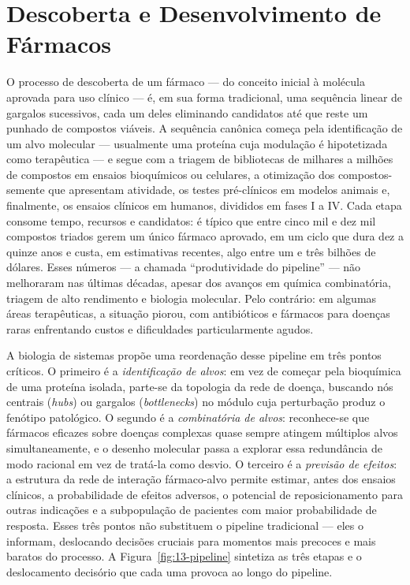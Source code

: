 \section{Descoberta e Desenvolvimento de Fármacos}
\label{sec:13-farmacos}

O processo de descoberta de um fármaco --- do conceito inicial à molécula aprovada para uso clínico --- é, em sua forma tradicional, uma sequência linear de gargalos sucessivos, cada um deles eliminando candidatos até que reste um punhado de compostos viáveis. A sequência canônica começa pela identificação de um alvo molecular --- usualmente uma proteína cuja modulação é hipotetizada como terapêutica --- e segue com a triagem de bibliotecas de milhares a milhões de compostos em ensaios bioquímicos ou celulares, a otimização dos compostos-semente que apresentam atividade, os testes pré-clínicos em modelos animais e, finalmente, os ensaios clínicos em humanos, divididos em fases I a IV. Cada etapa consome tempo, recursos e candidatos: é típico que entre cinco mil e dez mil compostos triados gerem um único fármaco aprovado, em um ciclo que dura dez a quinze anos e custa, em estimativas recentes, algo entre um e três bilhões de dólares. Esses números --- a chamada ``produtividade do pipeline'' --- não melhoraram nas últimas décadas, apesar dos avanços em química combinatória, triagem de alto rendimento e biologia molecular. Pelo contrário: em algumas áreas terapêuticas, a situação piorou, com antibióticos e fármacos para doenças raras enfrentando custos e dificuldades particularmente agudos.

A biologia de sistemas propõe uma reordenação desse pipeline em três pontos críticos. O primeiro é a \emph{identificação de alvos}: em vez de começar pela bioquímica de uma proteína isolada, parte-se da topologia da rede de doença, buscando nós centrais (\emph{hubs}) ou gargalos (\emph{bottlenecks}) no módulo cuja perturbação produz o fenótipo patológico. O segundo é a \emph{combinatória de alvos}: reconhece-se que fármacos eficazes sobre doenças complexas quase sempre atingem múltiplos alvos simultaneamente, e o desenho molecular passa a explorar essa redundância de modo racional em vez de tratá-la como desvio. O terceiro é a \emph{previsão de efeitos}: a estrutura da rede de interação fármaco-alvo permite estimar, antes dos ensaios clínicos, a probabilidade de efeitos adversos, o potencial de reposicionamento para outras indicações e a subpopulação de pacientes com maior probabilidade de resposta. Esses três pontos não substituem o pipeline tradicional --- eles o informam, deslocando decisões cruciais para momentos mais precoces e mais baratos do processo. A Figura~\ref{fig:13-pipeline} sintetiza as três etapas e o deslocamento decisório que cada uma provoca ao longo do pipeline.


